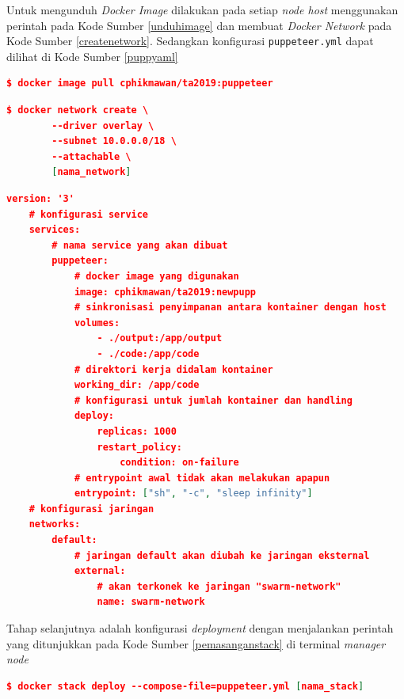 			\indent Untuk mengunduh \textit{Docker Image} dilakukan pada setiap \textit{node host} menggunakan perintah pada Kode Sumber \ref{unduhimage} dan membuat \textit{Docker Network} pada Kode Sumber \ref{createnetwork}. Sedangkan konfigurasi \texttt{puppeteer.yml} dapat dilihat di Kode Sumber \ref{puppyaml}
			\begin{lstlisting}[frame=single,tabsize=2,breaklines,caption={Perintah untuk mengunduh \textit{Docker Image} },label=unduhimage, captionpos=b, language=json,numbers=none]
	$ docker image pull cphikmawan/ta2019:puppeteer
			\end{lstlisting}
			
			\begin{lstlisting}[frame=single,tabsize=2,breaklines,caption={Perintah untuk membuat\textit{ Docker Network} },label=createnetwork, captionpos=b, language=json,numbers=none]
	$ docker network create \
		--driver overlay \
		--subnet 10.0.0.0/18 \
		--attachable \
		[nama_network]
			\end{lstlisting}
			
			\begin{lstlisting}[frame=single,tabsize=2,breaklines,caption={Konfigurasi \textit{puppeteer.yml}},label=puppyaml, captionpos=b, language=json]
	version: '3'
	# konfigurasi service
	services:
		# nama service yang akan dibuat
		puppeteer:
			# docker image yang digunakan
			image: cphikmawan/ta2019:newpupp
			# sinkronisasi penyimpanan antara kontainer dengan host
			volumes:
				- ./output:/app/output
				- ./code:/app/code
			# direktori kerja didalam kontainer
			working_dir: /app/code
			# konfigurasi untuk jumlah kontainer dan handling
			deploy:
				replicas: 1000
				restart_policy:
					condition: on-failure
			# entrypoint awal tidak akan melakukan apapun
			entrypoint: ["sh", "-c", "sleep infinity"]
	# konfigurasi jaringan
	networks:
		default:
			# jaringan default akan diubah ke jaringan eksternal
			external:
				# akan terkonek ke jaringan "swarm-network"
				name: swarm-network
			\end{lstlisting}
			
			\indent Tahap selanjutnya adalah konfigurasi \textit{deployment} dengan menjalankan perintah yang ditunjukkan pada Kode Sumber \ref{pemasanganstack} di terminal \textit{manager node}
			\begin{lstlisting}[frame=single,tabsize=2,breaklines,caption={Perintah untuk pemasangan kontainer },label=pemasanganstack, captionpos=b, language=json,numbers=none]
	$ docker stack deploy --compose-file=puppeteer.yml [nama_stack]
			\end{lstlisting}
	
